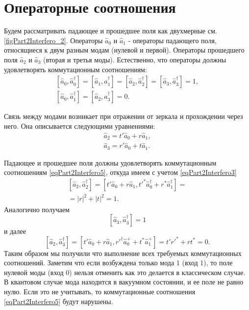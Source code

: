 \section{Операторные соотношения}
Будем рассматривать падающее и прошедшее поля как двухмерные
см. \autoref{figPart2Interfero_2}. Операторы $\hat{a}_0$ и 
$\hat{a}_1$ - операторы падающего поля, относящиеся к двум разным модам
(нулевой и первой). Операторы прошедшего поля $\hat{a}_2$ и 
$\hat{a}_3$ (вторая и третья моды). Естественно, что операторы должны
удовлетворять коммутационным соотношениям:
\begin{eqnarray}
\left[\hat{a}_0, \hat{a}_0^{\dag}\right] = 
\left[\hat{a}_1, \hat{a}_1^{\dag}\right] = 
\left[\hat{a}_2, \hat{a}_2^{\dag}\right] = 
\left[\hat{a}_3, \hat{a}_3^{\dag}\right] = 1,
\nonumber \\
\left[\hat{a}_0, \hat{a}_1^{\dag}\right] = 
\left[\hat{a}_2, \hat{a}_3^{\dag}\right] = 0.
\label{eqPart2Interfero5}
\end{eqnarray}



Связь между модами возникает при отражении от зеркала и прохождении
через него. Она описывается следующими уравнениями:
\begin{eqnarray}
\hat{a}_2 = t' \hat{a}_0 + r \hat{a}_1,
\nonumber \\
\hat{a}_3 = r' \hat{a}_0 + t \hat{a}_1.
\label{eqPart2Interfero6}
\end{eqnarray}

Падающее и прошедшее поля должны удовлетворять коммутационным
соотношениям \eqref{eqPart2Interfero5}, откуда имеем  с учетом 
\eqref{eqPart2Interfero3}
\begin{eqnarray}
\left[\hat{a}_2, \hat{a}_2^{\dag}\right] = 
\left[t' \hat{a}_0 + r \hat{a}_1, t'^{*} \hat{a}_0^{\dag} + r^{*}
  \hat{a}_1^{\dag}\right] =
\nonumber \\ = 
\left|r\right|^2 + \left|t\right|^2 = 1.
\label{eqPart2InterferoTask2a}
\end{eqnarray}
Аналогично получаем 
\begin{equation}
\left[\hat{a}_3, \hat{a}_3^{\dag}\right] = 1 
\label{eqPart2InterferoTask2b}
\end{equation}
и далее
\begin{equation}
\left[\hat{a}_2, \hat{a}_3^{\dag}\right] = 
\left[t' \hat{a}_0 + r \hat{a}_1, 
r'^{\dag} \hat{a}_0^{+} + t^{*} \hat{a}_1^{+}\right] = 
t' r'^{*} + r t^{*} = 0.
\label{eqPart2InterferoTask2c}
\end{equation}
Таким образом мы получили что выполнение всех требуемых коммутационных
соотношений. Заметим что если возбуждена только мода 1 (вход 1), то
поле нулевой моды (вход 0) нельзя отменить как это делается в
классическом случае. В квантовом случае мода находится в вакуумном
состоянии, и ее поле не равно нулю. Если это не учитывать, то
коммутационные соотношения \eqref{eqPart2Interfero5} будут нарушены.

